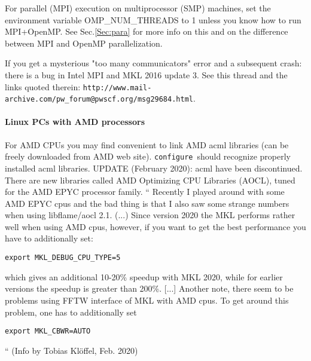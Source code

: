 \documentclass[12pt,a4paper]{article}
\def\configure{\texttt{configure}}
\begin{document}
For parallel (MPI) execution on multiprocessor (SMP) machines, set the
environment variable OMP\_NUM\_THREADS to 1 unless you know how to run
MPI+OpenMP. See Sec.\ref{Sec:para} for more info on this
and on the difference between MPI and OpenMP parallelization.

If you get a mysterious "too many communicators" error and a
subsequent crash: there is a bug in Intel MPI and MKL 2016 update 3.
See this thread and the links quoted therein:
\verb|http://www.mail-archive.com/pw_forum@pwscf.org/msg29684.html|.

\paragraph{Linux PCs with AMD processors}
For AMD CPUs you may find convenient to link AMD acml libraries
(can be freely downloaded from AMD web site).
\configure\ should recognize properly installed acml libraries.
UPDATE (February 2020): acml have been discontinued. There are new
libraries called AMD Optimizing CPU Libraries (AOCL), tuned for the
AMD EPYC processor family.
`` Recently I played around with some AMD EPYC cpus and the bad thing
is that I also saw some strange numbers when using libflame/aocl 2.1.
(...) Since version 2020 the MKL performs rather well when using AMD cpus,
 however, if you want to get the best performance you have to additionally set:
\begin{verbatim}
export MKL_DEBUG_CPU_TYPE=5
\end{verbatim}
which gives an additional 10-20\% speedup with MKL 2020,
while for earlier versions the speedup is greater than 200\%.
[...] Another note, there seem to be problems using FFTW interface
of MKL with  AMD cpus. To get around this problem, one has to
additionally set
\begin{verbatim}
export MKL_CBWR=AUTO
\end{verbatim}
`` (Info by Tobias Kl\"offel, Feb. 2020)
\end{document}

